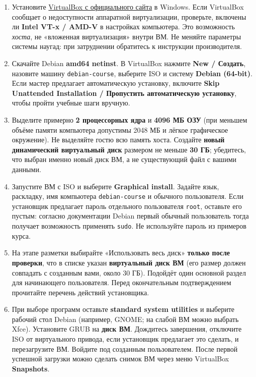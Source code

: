 \begin{enumerate}
\def\labelenumi{\arabic{enumi}.}
\tightlist
\item
  Установите \href{https://www.virtualbox.org/wiki/Downloads}{VirtualBox
  с официального сайта} в Windows. Если VirtualBox сообщает о
  недоступности аппаратной виртуализации, проверьте, включены ли
  \textbf{Intel VT-x / AMD-V} в настройках компьютера. Это возможность
  \emph{хоста}, не «вложенная виртуализация» внутри ВМ. Не меняйте
  параметры системы наугад: при затруднении обратитесь к инструкции
  производителя.
\item
  Скачайте Debian \textbf{amd64 netinst}. В VirtualBox нажмите
  \textbf{New / Создать}, назовите машину \texttt{debian-course},
  выберите ISO и систему \textbf{Debian (64-bit)}. Если мастер
  предлагает автоматическую установку, включите \textbf{Skip Unattended
  Installation / Пропустить автоматическую установку}, чтобы пройти
  учебные шаги вручную.
\item
  Выделите примерно \textbf{2 процессорных ядра} и \textbf{4096 МБ ОЗУ}
  (при меньшем объёме памяти компьютера допустимы 2048 МБ и лёгкое
  графическое окружение). Не выделяйте гостю всю память хоста. Создайте
  \textbf{новый динамический виртуальный диск} размером не меньше
  \textbf{30 ГБ}; убедитесь, что выбран именно новый диск ВМ, а не
  существующий файл с вашими данными.
\item
  Запустите ВМ с ISO и выберите \textbf{Graphical install}. Задайте
  язык, раскладку, имя компьютера \texttt{debian-course} и обычного
  пользователя. Если установщик предлагает пароль отдельного
  пользователя \texttt{root}, оставьте его пустым: согласно документации
  Debian первый обычный пользователь тогда получает возможность
  применять \texttt{sudo}. Не используйте пароль из примеров курса.
\item
  На этапе разметки выбирайте «Использовать весь диск» \textbf{только
  после проверки}, что в списке указан \textbf{виртуальный диск ВМ} (его
  размер должен совпадать с созданным вами, около 30 ГБ). Подойдёт один
  основной раздел для начинающего пользователя. Перед окончательным
  подтверждением прочитайте перечень действий установщика.
\item
  При выборе программ оставьте \textbf{standard system utilities} и
  выберите рабочий стол Debian (например, GNOME; на слабой ВМ можно
  выбрать Xfce). Установите GRUB на \textbf{диск ВМ}. Дождитесь
  завершения, отключите ISO от виртуального привода, если установщик
  предлагает это сделать, и перезагрузите ВМ. Войдите под созданным
  пользователем. После первой успешной загрузки можно сделать снимок ВМ
  через меню VirtualBox \textbf{Snapshots}.
\end{enumerate}


